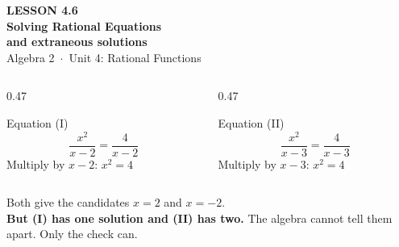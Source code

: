 \documentclass[aspectratio=169, 11pt]{beamer}
\begin{document}
{
\begin{frame}[plain]
  \vspace{2.8cm}\hspace{0.55cm}%
  \begin{minipage}{0.9\textwidth}
    {\color{goldacc}\bfseries\small LESSON 4.6}\\[0.5cm]
    {\color{white}\bfseries\LARGE Solving Rational Equations}\\[0.35cm]
    {\color{white}\bfseries\large and extraneous solutions}\\[1.0cm]
    {\color{forestmid}\small Algebra 2~$\cdot$~Unit 4: Rational Functions}
  \end{minipage}
\end{frame}
}

\begin{frame}[t, plain]
  \begin{columns}[T]
    \begin{column}{0.47\textwidth}
      \begin{block}{Equation (I)}
        \[ \frac{x^2}{x-2}=\frac{4}{x-2} \]
        \centering Multiply by $x-2$: \; $x^2=4$
      \end{block}
    \end{column}
    \begin{column}{0.47\textwidth}
      \begin{block}{Equation (II)}
        \[ \frac{x^2}{x-3}=\frac{4}{x-3} \]
        \centering Multiply by $x-3$: \; $x^2=4$
      \end{block}
    \end{column}
  \end{columns}
  \vspace{8pt}
  \begin{block}{}
    \centering Both give the candidates $x=2$ and $x=-2$. \\[3pt]
    \textbf{But (I) has one solution and (II) has two.} The algebra cannot tell them apart.
    Only the check can.
  \end{block}
\end{frame}
\end{document}

